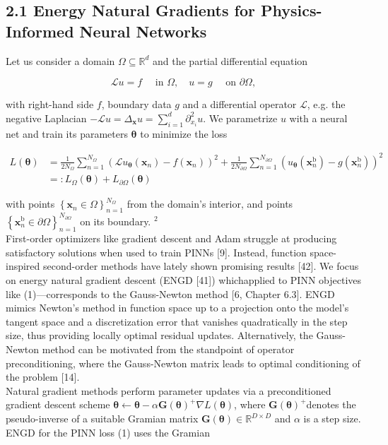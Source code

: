 \documentclass[10pt]{article}
\begin{document}
\subsection*{2.1 Energy Natural Gradients for Physics-Informed Neural Networks}
Let us consider a domain $\Omega \subseteq \mathbb{R}^{d}$ and the partial differential equation

$$
\mathcal{L} u=f \quad \text { in } \Omega, \quad u=g \quad \text { on } \partial \Omega,
$$

with right-hand side $f$, boundary data $g$ and a differential operator $\mathcal{L}$, e.g. the negative Laplacian $-\mathcal{L} u=\Delta_{\boldsymbol{x}} u=\sum_{i=1}^{d} \partial_{x_{i}}^{2} u$. We parametrize $u$ with a neural net and train its parameters $\boldsymbol{\theta}$ to minimize the loss


\begin{align*}
L(\boldsymbol{\theta}) & =\frac{1}{2 N_{\Omega}} \sum_{n=1}^{N_{\Omega}}\left(\mathcal{L} u_{\boldsymbol{\theta}}\left(\boldsymbol{x}_{n}\right)-f\left(\boldsymbol{x}_{n}\right)\right)^{2}+\frac{1}{2 N_{\partial \Omega}} \sum_{n=1}^{N_{\partial \Omega}}\left(u_{\boldsymbol{\theta}}\left(\boldsymbol{x}_{n}^{\mathrm{b}}\right)-g\left(\boldsymbol{x}_{n}^{\mathrm{b}}\right)\right)^{2}  \tag{1}\\
& =: L_{\Omega}(\boldsymbol{\theta})+L_{\partial \Omega}(\boldsymbol{\theta})
\end{align*}


with points $\left\{\boldsymbol{x}_{n} \in \Omega\right\}_{n=1}^{N_{\Omega}}$ from the domain's interior, and points $\left\{\boldsymbol{x}_{n}^{\mathrm{b}} \in \partial \Omega\right\}_{n=1}^{N_{\partial \Omega}}$ on its boundary. ${ }^{2}$\\[0pt]
First-order optimizers like gradient descent and Adam struggle at producing satisfactory solutions when used to train PINNs [9]. Instead, function space-inspired second-order methods have lately shown promising results [42]. We focus on energy natural gradient descent (ENGD [41]) whichapplied to PINN objectives like (1)—corresponds to the Gauss-Newton method [6, Chapter 6.3]. ENGD mimics Newton's method in function space up to a projection onto the model's tangent space and a discretization error that vanishes quadratically in the step size, thus providing locally optimal residual updates. Alternatively, the Gauss-Newton method can be motivated from the standpoint of operator preconditioning, where the Gauss-Newton matrix leads to optimal conditioning of the problem [14].\\
Natural gradient methods perform parameter updates via a preconditioned gradient descent scheme $\boldsymbol{\theta} \leftarrow \boldsymbol{\theta}-\alpha \boldsymbol{G}(\boldsymbol{\theta})^{+} \nabla L(\boldsymbol{\theta})$, where $\boldsymbol{G}(\boldsymbol{\theta})^{+}$denotes the pseudo-inverse of a suitable Gramian matrix $\boldsymbol{G}(\boldsymbol{\theta}) \in \mathbb{R}^{D \times D}$ and $\alpha$ is a step size. ENGD for the PINN loss (1) uses the Gramian
\end{document}
